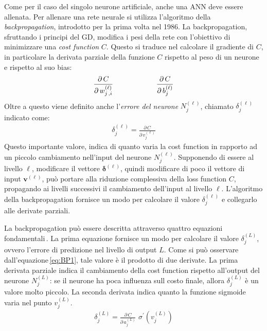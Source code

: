 Come per il caso del singolo neurone artificiale, anche una \acs{ANN} deve essere allenata. Per allenare una rete neurale si utilizza l'algoritmo della \textit{backpropagation}, introdotto per la prima volta nel 1986. La backpropagation, sfruttando i principi del \acs{GD}, modifica i pesi della rete con l'obiettivo di minimizzare una \textsl{cost function} $C$. Questo si traduce nel calcolare il gradiente di $C$, in particolare la derivata parziale della funzione $C$ rispetto al peso di un neurone e rispetto al suo bias:
% 
\begin{gather*}
    \frac{\partial\,C}{\partial\,w^{(\ell)}_{j\,,i}}
    \hspace{60px}
    \frac{\partial\,C}{\partial\,b^{(\ell)}_j}
\end{gather*}
% 
\noindent Oltre a questo viene definito anche l'\textsl{errore del neurone} $N^{(\ell)}_j$, chiamato $\delta^{(\ell)}_j$ indicato come:
% 
\begin{gather*}
    \delta^{(\ell)}_j = \frac{\partial\,C}{\partial\,v^{(\ell)}_j}
\end{gather*}
% 
\noindent Questo importante valore, indica di quanto varia la cost function in rapporto ad un piccolo cambiamento nell'input del neurone $N^{(\ell)}_j$. Supponendo di essere al livello $\ell$, modificare il vettore $\boldsymbol{\delta}^{(\ell)}$, quindi modificare di poco il vettore di input $\mathbf{v}^{(\ell)}$, può portare alla riduzione complessiva della loss function $C$, propagando ai livelli successivi il cambiamento dell'input al livello $\ell$. L'algoritmo della backpropagation fornisce un modo per calcolare il valore $\delta^{(\ell)}_j$ e collegarlo alle derivate parziali.

La backpropagation può essere descritta attraverso quattro equazioni fondamentali\,\cite{nielsen2015neural}. La prima equazione fornisce un modo per calcolare il valore $\delta^{(L)}_j$, ovvero l'errore di predizione nel livello di output $L$. Come si può osservare dall'equazione\,\ref{eq:BP1}, tale valore è il prodotto di due derivate. La prima derivata parziale indica il cambiamento della cost function rispetto all'output del neurone $N^{(L)}_j$: se il neurone ha poca influenza sull costo finale, allora $\delta^{(L)}_j$ è un valore molto piccolo. La seconda derivata indica quanto la funzione sigmoide varia nel punto $v^{(L)}_j$.
% 
\begin{gather}
    \delta^{(L)}_j = \frac{\partial\,C}{\partial\,a^{(L)}_j} \,\, \sigma^\prime \left( v^{(L)}_j \right)
    \label{eq:BP1}
\end{gather}


